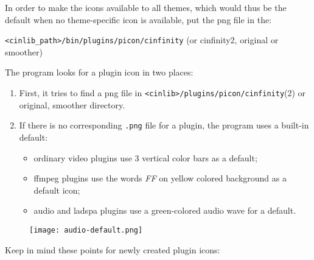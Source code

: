 In order to make the icons available to all themes, which would thus be the default when no theme-specific icon is available, put the png file in the:

\texttt{<cinlib\_path>/bin/plugins/picon/cinfinity} (or cinfinity2, original or smoother)

The \CGG{} program looks for a plugin icon in two places:

\begin{enumerate}
    \item First, it tries to find a png file in \texttt{<cinlib>/plugins/picon/cinfinity}(2) or original, smoother directory.
    \item If there is no corresponding \texttt{.png} file for a plugin, the program uses a built-in default:
    \begin{itemize}
        \item ordinary video plugins use 3 vertical color bars as a default;
        \item ffmpeg plugins use the words \textit{FF} on yellow colored background as a default icon;
        \item audio and ladspa plugins use a green-colored audio wave for a default.
    \end{itemize}
\end{enumerate}
\begin{figure}[htpb]
    \centering
    \texttt{[image: audio-default.png]}
\end{figure}

Keep in mind these points for newly created plugin icons:

